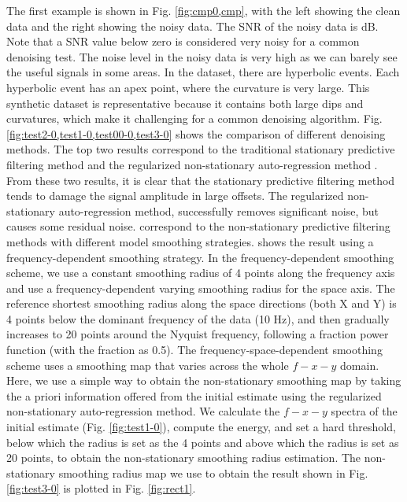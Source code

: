 The first example is shown in Fig. \ref{fig:cmp0,cmp}, with the left showing the clean data and the right showing the noisy data. The SNR of the noisy data is  dB. Note that a SNR value below zero is considered very noisy for a common denoising test. The noise level in the noisy data is very high as we can barely see the useful signals in some areas. In the dataset, there are  hyperbolic events. Each hyperbolic event has an apex point, where the curvature is very large. This synthetic dataset is representative because it contains both large dips and curvatures, which make it challenging for a common denoising algorithm. Fig. \ref{fig:test2-0,test1-0,test00-0,test3-0} shows the comparison of different denoising methods. The top two results correspond to the traditional stationary predictive filtering method \cite{canales1984} and the regularized non-stationary auto-regression method \cite{guochang2012}. From these two results, it is clear that the stationary predictive filtering method tends to damage the signal amplitude in large offsets. The regularized non-stationary auto-regression method, successfully removes significant noise, but causes some residual noise.  correspond to the non-stationary predictive filtering methods with different model smoothing strategies.  shows the result using a frequency-dependent smoothing strategy. In the frequency-dependent smoothing scheme, we use a constant smoothing radius of 4 points along the frequency axis and use a frequency-dependent varying smoothing radius for the space axis. The reference shortest smoothing radius along the space directions (both X and Y) is 4 points below the dominant frequency of the data (10 Hz), and then gradually increases to 20 points around the Nyquist frequency, following a fraction power function (with the fraction as 0.5). The 
frequency-space-dependent smoothing scheme uses a smoothing map that varies across the whole $f-x-y$ domain. Here, we use a simple way to obtain the non-stationary smoothing map by taking the a priori information offered from the initial estimate using the regularized non-stationary auto-regression method. We calculate the $f-x-y$ spectra of the initial estimate (Fig. \ref{fig:test1-0}), compute the energy, and set a hard threshold, below which the radius is set as the 4 points and above which the radius is set as 20 points, to obtain the non-stationary smoothing radius estimation. The non-stationary smoothing radius map we use to obtain the result shown in Fig. \ref{fig:test3-0} is plotted in Fig. \ref{fig:rect1}. 
